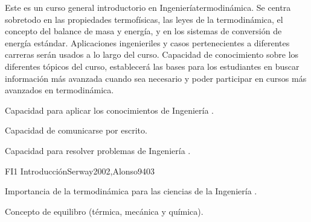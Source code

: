 \begin{syllabus}


\begin{justification}
Este es un curso general introductorio en Ingenieríatermodinámica. 
Se centra sobretodo en las propiedades termofísicas, las leyes de la termodinámica, 
el concepto del balance de masa y energía, y en los sistemas de conversión de energía estándar.
Aplicaciones ingenieriles y casos pertenecientes a diferentes carreras serán usados a lo largo del curso.
Capacidad de conocimiento sobre los diferentes tópicos del curso, establecerá las bases para los estudiantes
en buscar información más avanzada cuando sea necesario y poder participar en cursos más avanzados en termodinámica.

% 

\end{justification}

\begin{goals}
\item Capacidad para aplicar los conocimientos de Ingeniería .
\item Capacidad de comunicarse por escrito.
\item Capacidad para resolver problemas de Ingeniería .


\end{goals}

\begin{outcomes}
\end{outcomes}

\begin{unit}{FI1 Introducción}{Serway2002,Alonso94}{0}{3}
\begin{topics}
      \item Importancia de la termodinámica para las ciencias de la Ingeniería .
      \item Concepto de equilibro (térmica, mecánica y química).
      

\end{topics}
\end{unit}
\end{syllabus}
